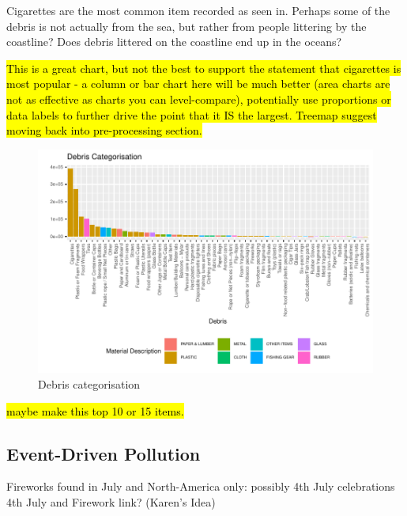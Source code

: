 \documentclass[10pt]{article}\usepackage[]{graphicx}\usepackage[]{color}
\newenvironment{knitrout}{}{} %
\begin{document}
Cigarettes are the most common item recorded as seen in. %
Perhaps some of the debris is not actually from the sea, but rather from people littering by the coastline? Does debris littered on the coastline end up in the oceans?

\hl{This is a great chart, but not the best to support the statement that cigarettes is most popular - a column or bar chart here will be much better (area charts are not as effective as charts you can level-compare), potentially use proportions or data labels to further drive the point that it IS the largest. Treemap suggest moving back into pre-processing section.}


\begin{figure}[H] %
\begin{center}
\begin{knitrout}\small
{}\color{fgcolor}
\includegraphics[width=1\linewidth]{figure/unnamed-chunk-14-1} 

\end{knitrout}
\caption {Debris categorisation}
\label{figI2}
\end {center}
\end {figure}

\hl{maybe make this top 10 or 15 items.}


\subsection{Event-Driven Pollution}

Fireworks found in July and North-America only: possibly 4th July celebrations\\
4th July and Firework link? (Karen's Idea)\\
\end{document}

